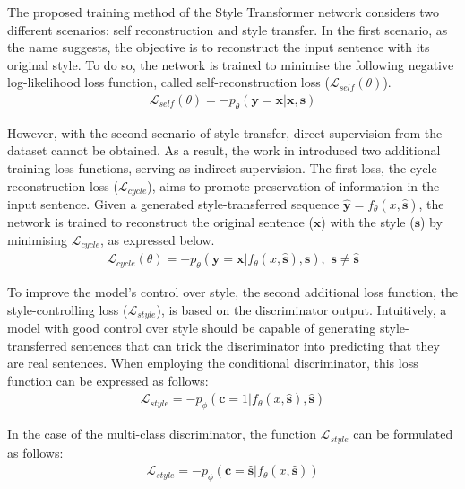 \documentclass[acmsmall]{acmart}
\begin{document}
The proposed training method of the Style Transformer network considers two different scenarios: self reconstruction and style transfer. In the first scenario, as the name suggests, the objective is to reconstruct the input sentence with its original style. To do so, the network is trained to minimise the following negative log-likelihood loss function, called self-reconstruction loss ($\mathcal{L}_{self}(\theta)$).
\begin{gather}
    \mathcal{L}_{self}(\theta) = -p_{\theta}(\mathbf{y}=\mathbf{x}|\mathbf{x}, \mathbf{s}) \label{eq:self-loss}
\end{gather}

However, with the second scenario of style transfer, direct supervision from the dataset cannot be obtained. As a result, the work in \cite{style-transformer} introduced two additional training loss functions, serving as indirect supervision. The first loss, the cycle-reconstruction loss ($\mathcal{L}_{cycle}$), aims to promote preservation of information in the input sentence. Given a generated style-transferred sequence $\hat{\mathbf{y}}=f_{\theta}(x, \hat{\mathbf{s}})$, the network is trained to reconstruct the original sentence ($\mathbf{x}$) with the style ($\mathbf{s}$) by minimising $\mathcal{L}_{cycle}$, as expressed below.
\begin{gather}
    \mathcal{L}_{cycle}(\theta) = -p_{\theta}(\mathbf{y}=\mathbf{x}|f_{\theta}(x, \hat{\mathbf{s}}), \mathbf{s}),\,\,\mathbf{s}\neq\hat{\mathbf{s}}
\end{gather}

To improve the model's control over style, the second additional loss function, the style-controlling loss ($\mathcal{L}_{style}$), is based on the discriminator output. Intuitively, a model with good control over style should be capable of generating style-transferred sentences that can trick the discriminator into predicting that they are real sentences. When employing the conditional discriminator, this loss function can be expressed as follows:
\begin{gather}
    \mathcal{L}_{style} = -p_{\phi}(\mathbf{c}=1|f_{\theta}(x, \hat{\mathbf{s}}), \hat{\mathbf{s}})
\end{gather}

In the case of the multi-class discriminator, the function $\mathcal{L}_{style}$ can be formulated as follows:
\begin{gather}
    \mathcal{L}_{style} = -p_{\phi}(\mathbf{c}=\hat{\mathbf{s}}|f_{\theta}(x, \hat{\mathbf{s}}))
\end{gather}
\end{document}

